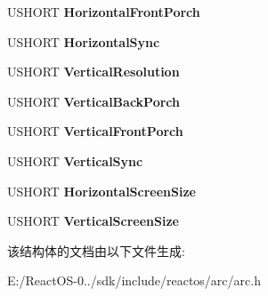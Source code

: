 \begin{DoxyCompactItemize}
U\+S\+H\+O\+RT {\bfseries Horizontal\+Front\+Porch}
\item 
\mbox{\label{struct___m_o_n_i_t_o_r___c_o_n_f_i_g_u_r_a_t_i_o_n___d_a_t_a_ab2bf913f87392f4ab9ca66b9366379a2}} 
U\+S\+H\+O\+RT {\bfseries Horizontal\+Sync}
\item 
\mbox{\label{struct___m_o_n_i_t_o_r___c_o_n_f_i_g_u_r_a_t_i_o_n___d_a_t_a_a5c9e467167e8b6c55f39bcba3302d9eb}} 
U\+S\+H\+O\+RT {\bfseries Vertical\+Resolution}
\item 
\mbox{\label{struct___m_o_n_i_t_o_r___c_o_n_f_i_g_u_r_a_t_i_o_n___d_a_t_a_a8cd5f33f43155e1338e1cc91ced433c0}} 
U\+S\+H\+O\+RT {\bfseries Vertical\+Back\+Porch}
\item 
\mbox{\label{struct___m_o_n_i_t_o_r___c_o_n_f_i_g_u_r_a_t_i_o_n___d_a_t_a_aefaf815a47643365f5d7811c290b2afa}} 
U\+S\+H\+O\+RT {\bfseries Vertical\+Front\+Porch}
\item 
\mbox{\label{struct___m_o_n_i_t_o_r___c_o_n_f_i_g_u_r_a_t_i_o_n___d_a_t_a_ac5f53a3a0e2fd5dd263c839978d6e32c}} 
U\+S\+H\+O\+RT {\bfseries Vertical\+Sync}
\item 
\mbox{\label{struct___m_o_n_i_t_o_r___c_o_n_f_i_g_u_r_a_t_i_o_n___d_a_t_a_aff389038e0908011c1d55f47f6223a7d}} 
U\+S\+H\+O\+RT {\bfseries Horizontal\+Screen\+Size}
\item 
\mbox{\label{struct___m_o_n_i_t_o_r___c_o_n_f_i_g_u_r_a_t_i_o_n___d_a_t_a_a73a3591f2c6ac88130f2aa2cd300f239}} 
U\+S\+H\+O\+RT {\bfseries Vertical\+Screen\+Size}
\end{DoxyCompactItemize}


该结构体的文档由以下文件生成\+:\begin{DoxyCompactItemize}
\item 
E\+:/\+React\+O\+S-\/0../sdk/include/reactos/arc/arc.\+h\end{DoxyCompactItemize}
